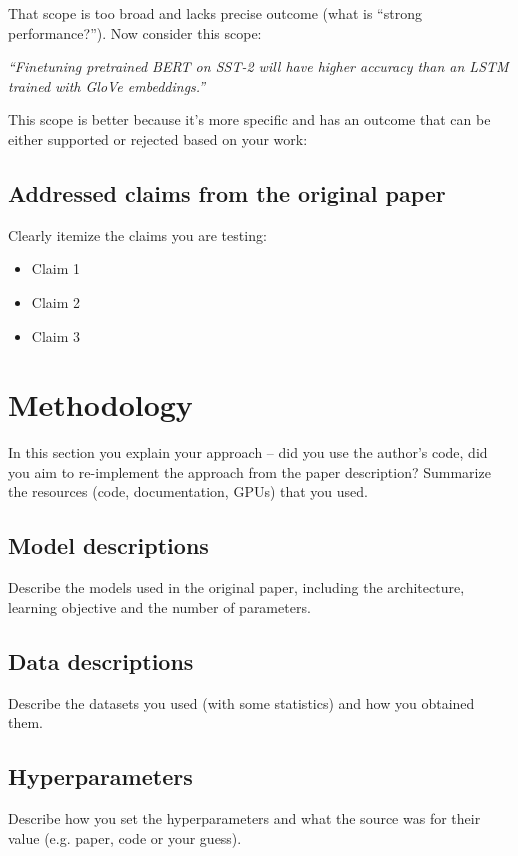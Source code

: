 \documentclass[11pt,a4paper]{article}
\begin{document}
    That scope is too broad and lacks precise outcome (what is ``strong performance?''). Now consider this scope:

    \textit{``Finetuning pretrained BERT on SST-2 will have higher accuracy than an LSTM trained with GloVe embeddings.''}

    This scope is better because it's more specific and has an outcome that can be either supported or rejected based on your work:

    \subsection{Addressed claims from the original paper}

    Clearly itemize the claims you are testing:
    \begin{itemize}
        \item Claim 1
        \item Claim 2
        \item Claim 3
    \end{itemize}


    \section{Methodology}

    In this section you explain your approach -- did you use the author's code, did you aim to re-implement the approach from the paper description? Summarize the resources (code, documentation, GPUs) that you used.

    \subsection{Model descriptions}
    Describe the models used in the original paper, including the architecture, learning objective and the number of parameters.

    \subsection{Data descriptions}
    Describe the datasets you used (with some statistics) and how you obtained them.

    \subsection{Hyperparameters}
    Describe how you set the hyperparameters and what the source was for their value (e.g. paper, code or your guess).
\end{document}
